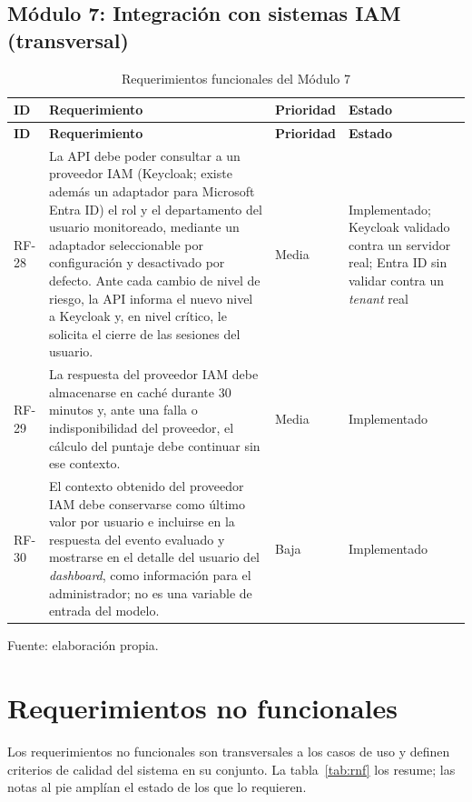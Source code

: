 \subsection{Módulo 7: Integración con sistemas IAM (transversal)}
\begin{tablacompacta}
\begin{longtable}{P{1.1cm}P{9.3cm}C{1.6cm}P{2.6cm}}
	\caption{Requerimientos funcionales del Módulo 7}
	\label{tab:rf-modulo7}\\
	\hline
	\textbf{ID} & \textbf{Requerimiento} & \textbf{Prioridad} & \textbf{Estado} \\
	\hline
	\endfirsthead
	\hline
	\textbf{ID} & \textbf{Requerimiento} & \textbf{Prioridad} & \textbf{Estado} \\
	\hline
	\endhead
	RF-28 & La API debe poder consultar a un proveedor IAM (Keycloak; existe además un adaptador para Microsoft Entra ID) el rol y el departamento del usuario monitoreado, mediante un adaptador seleccionable por configuración y desactivado por defecto. Ante cada cambio de nivel de riesgo, la API informa el nuevo nivel a Keycloak y, en nivel crítico, le solicita el cierre de las sesiones del usuario. & Media & Implementado; Keycloak validado contra un servidor real; Entra ID sin validar contra un \emph{tenant} real \\
	\hline
	RF-29 & La respuesta del proveedor IAM debe almacenarse en caché durante 30 minutos y, ante una falla o indisponibilidad del proveedor, el cálculo del puntaje debe continuar sin ese contexto. & Media & Implementado \\
	\hline
	RF-30 & El contexto obtenido del proveedor IAM debe conservarse como último valor por usuario e incluirse en la respuesta del evento evaluado y mostrarse en el detalle del usuario del \emph{dashboard}, como información para el administrador; no es una variable de entrada del modelo. & Baja & Implementado \\
	\hline
\end{longtable}
{\small Fuente: elaboración propia.\par}
\end{tablacompacta}


\section{Requerimientos no funcionales}
\label{sec:requerimientos-no-funcionales}
Los requerimientos no funcionales son transversales a los casos de uso y definen criterios de calidad del sistema en su conjunto. La tabla~\ref{tab:rnf} los resume; las notas al pie amplían el estado de los que lo requieren.

